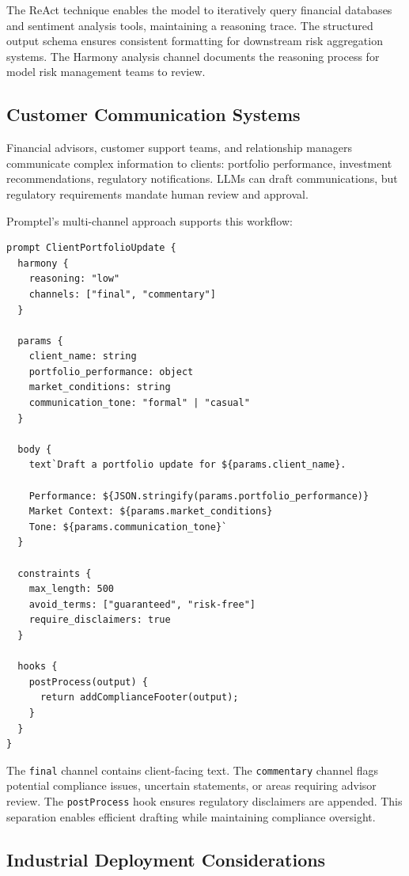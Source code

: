 \documentclass[11pt,a4paper]{article}
\begin{document}
The ReAct technique enables the model to iteratively query financial databases and sentiment analysis tools, maintaining a reasoning trace. The structured output schema ensures consistent formatting for downstream risk aggregation systems. The Harmony analysis channel documents the reasoning process for model risk management teams to review.

\subsection{Customer Communication Systems}

Financial advisors, customer support teams, and relationship managers communicate complex information to clients: portfolio performance, investment recommendations, regulatory notifications. LLMs can draft communications, but regulatory requirements mandate human review and approval.

Promptel's multi-channel approach supports this workflow:

\begin{lstlisting}[caption=Client communication generation]
prompt ClientPortfolioUpdate {
  harmony {
    reasoning: "low"
    channels: ["final", "commentary"]
  }

  params {
    client_name: string
    portfolio_performance: object
    market_conditions: string
    communication_tone: "formal" | "casual"
  }

  body {
    text`Draft a portfolio update for ${params.client_name}.

    Performance: ${JSON.stringify(params.portfolio_performance)}
    Market Context: ${params.market_conditions}
    Tone: ${params.communication_tone}`
  }

  constraints {
    max_length: 500
    avoid_terms: ["guaranteed", "risk-free"]
    require_disclaimers: true
  }

  hooks {
    postProcess(output) {
      return addComplianceFooter(output);
    }
  }
}
\end{lstlisting}

The \texttt{final} channel contains client-facing text. The \texttt{commentary} channel flags potential compliance issues, uncertain statements, or areas requiring advisor review. The \texttt{postProcess} hook ensures regulatory disclaimers are appended. This separation enables efficient drafting while maintaining compliance oversight.

\subsection{Industrial Deployment Considerations}
\end{document}
